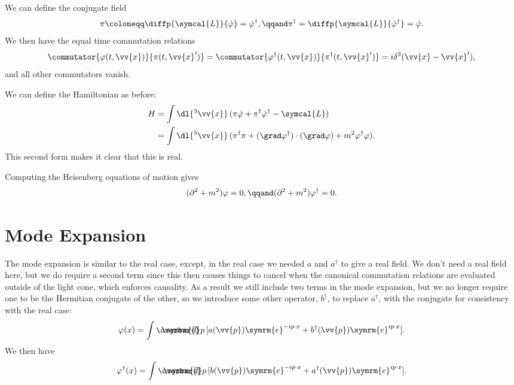 \documentclass[fleqn]{NotesClass}
\newcommand{\dalembertian}{\partial^2}
\newcommand{\e}{\symrm{e}}
\newcommand{\lagrangianDensity}{\symcal{L}}
\newcommand{\hermit}{{\dagger}}
\newcommand\dbar{\ThisStyle{\ensurestackMath{%
            \stackengine{-.3\LMpt}{\SavedStyle \symrm{d}}{\SavedStyle\overbar{}%
                \mkern2.25mu}{O}{r}{F}{F}{L}}}}
\newcommand{\invariantmeasure}[1]{\dbar #1}
\begin{document}
    We can define the conjugate field
    \begin{equation}
        \pi \coloneqq \diffp{\lagrangianDensity}{\dot{\varphi}} = \dot{\varphi}^\hermit, \qqand \pi^\hermit = \diffp{\lagrangianDensity}{\dot{\varphi}^\hermit} = \dot{\varphi}.
    \end{equation}
    We then have the equal time commutation relations
    \begin{equation}
        \commutator{\varphi(t, \vv{x})}{\pi(t, \vv{x}')} = \commutator{\varphi^\hermit(t, \vv{x})}{\pi^\hermit(t, \vv{x}')} = i\delta^3(\vv{x} - \vv{x}'),
    \end{equation}
    and all other commutators vanish.
    
    We can define the Hamiltonian as before:
    \begin{align}
        H &= \int \dl{^3\vv{x}} \, (\pi\dot{\varphi} + \pi^\hermit \dot{\varphi}^\hermit - \lagrangianDensity)\\
        &= \int \dl{^3\vv{x}} \, (\pi^\hermit \pi + (\grad \varphi^\hermit) \cdot (\grad \varphi) + m^2 \varphi^\hermit \varphi).
    \end{align}
    This second form makes it clear that this is real.
    
    Computing the Heisenberg equations of motion gives
    \begin{equation}
        (\dalembertian + m^2)\varphi = 0, \qqand (\dalembertian + m^2)\varphi^\hermit = 0.
    \end{equation}
    
    \section{Mode Expansion}
    The mode expansion is similar to the real case, except, in the real case we needed \(a\) and \(a^\hermit\) to give a real field.
    We don't need a real field here, but we do require a second term since this then causes things to cancel when the canonical commutation relations are evaluated outside of the light cone, which enforces causality.
    As a result we still include two terms in the mode expansion, but we no longer require one to be the Hermitian conjugate of the other, so we introduce some other operator, \(b^\hermit\), to replace \(a^\hermit\), with the conjugate for consistency with the real case:
    \begin{equation}
        \varphi(x) = \int \invariantmeasure{p} \, [a(\vv{p}) \e^{-ip\cdot x} + b^\hermit(\vv{p}) \e^{ip \cdot x}].
    \end{equation}
    We then have
    \begin{equation}
        \varphi^\hermit(x) = \int \invariantmeasure{p} \, [b(\vv{p}) \e^{-ip\cdot x} + a^\hermit(\vv{p})\e^{ip\cdot x}].
    \end{equation}
    
\end{document}
